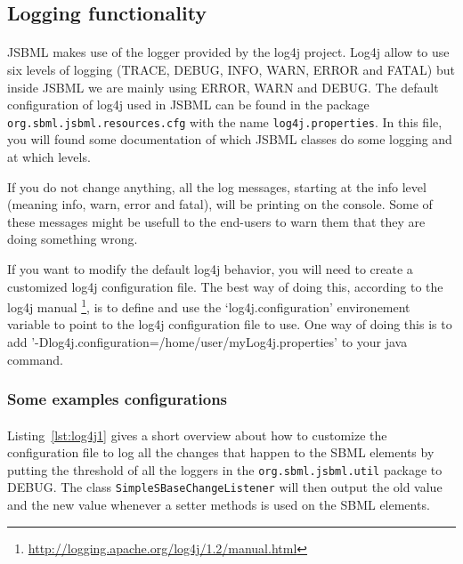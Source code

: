 \subsection{Logging functionality}

\paragraph{}JSBML makes use of the logger provided by the log4j project.
Log4j allow to use six levels of logging (TRACE, DEBUG, INFO, WARN, ERROR and
FATAL) but inside JSBML we are mainly using ERROR, WARN and DEBUG. The default 
configuration of log4j used in JSBML can be found in the package
\texttt{org.sbml.jsbml.resources.cfg} with the name \texttt{log4j.properties}.
In this file, you will found some documentation of which JSBML classes do some 
logging and at which levels. 
 
If you do not change anything, all the log messages, starting at the info level 
(meaning info, warn, error and fatal), will be printing on the console.
Some of these messages might be usefull to the end-users to warn them that
 they are doing something wrong.


If you want to modify the default log4j behavior, you will need to create a customized 
log4j configuration file. The best way of doing this, according to the log4j manual
\footnote{\url{http://logging.apache.org/log4j/1.2/manual.html}}, is to define and use the
`log4j.configuration' environement variable to point to the log4j configuration file to use. 
One way of doing this is to add
'-Dlog4j.configuration=/home/user/myLog4j.properties' to your java command.


\subsubsection{Some examples configurations}


\paragraph{}Listing~\vref{lst:log4j1} gives a short overview about how to customize the
configuration file to log all the changes that happen to the SBML elements by
putting the threshold of all the loggers in the \texttt{org.sbml.jsbml.util} package to DEBUG.
The class \texttt{SimpleSBaseChangeListener} will then output the old value and the new value
whenever a setter methods is used on the SBML elements.

